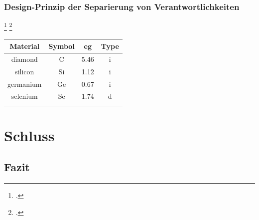 \subsubsection{Design-Prinzip der Separierung von Verantwortlichkeiten}
\blindtext\footcite[Vgl. ][79]{Schelinski2019}
\blinditemize\footcite[Vgl. ][34]{Digitaloekonomie}
\Blindtext

\begin{center}
    \begin{tabular}{cccc}
        Material        & Symbol &  eg  & Type \\
        \hline
        diamond         & C      & 5.46 & i \\
        silicon         & Si     & 1.12 & i \\
        germanium       & Ge     & 0.67 & i \\
        selenium        & Se     & 1.74 & d \\
        \hline
        \multicolumn{4}{c}{
            \captionsetup{width=.6\textwidth}
            \capquelle{\cite[][212]{bsp}}\label{tab_bsp}
        }
    \end{tabular}

\end{center}

\section{Schluss}
\subsection{Fazit}
\Blindtext






